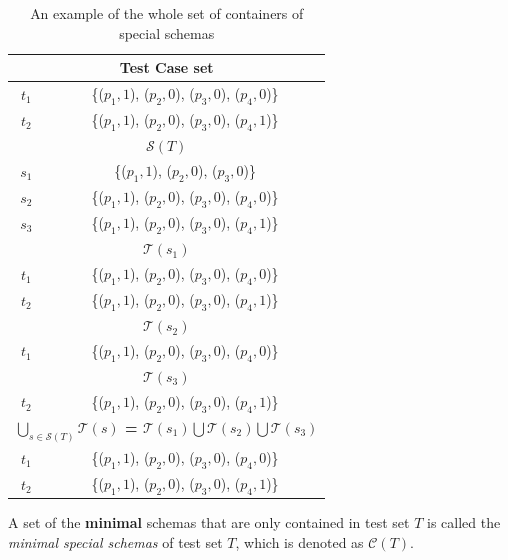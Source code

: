 \begin{table}[htbp]
  \centering
  \caption{An example of the whole set of containers of special schemas}
      \label{ex:prospecialschemasoftestset}
    \begin{tabular}{|c|c|} \hline
  \multicolumn{2}{|c|}{\textbf{Test Case set}} \\ \hline
  $t_{1}$ & \{($p_{1}, 1$), ($p_{2}, 0$), ($p_{3}, 0$), ($p_{4}, 0$)\}\\
  $t_{2}$ & \{($p_{1}, 1$), ($p_{2}, 0$), ($p_{3}, 0$), ($p_{4}, 1$)\}\\ \hline
  \multicolumn{2}{|c|}{\textbf{ $\mathcal{S}(T)$ }}  \\ \hline
  $s_{1}$ & \{($p_{1}, 1$), ($p_{2}, 0$), ($p_{3}, 0$)\}  \\
  $s_{2}$ & \{($p_{1}, 1$), ($p_{2}, 0$), ($p_{3}, 0$), ($p_{4}, 0$)\} \\
  $s_{3}$ & \{($p_{1}, 1$), ($p_{2}, 0$), ($p_{3}, 0$), ($p_{4}, 1$)\} \\ \hline
   \multicolumn{2}{|c|}{\textbf{ $\mathcal{T}(s_{1})$}}  \\ \hline
  $t_{1}$ & \{($p_{1}, 1$), ($p_{2}, 0$), ($p_{3}, 0$), ($p_{4}, 0$)\} \\
  $t_{2}$ & \{($p_{1}, 1$), ($p_{2}, 0$), ($p_{3}, 0$), ($p_{4}, 1$)\} \\ \hline
      \multicolumn{2}{|c|}{\textbf{ $\mathcal{T}(s_{2})$}}  \\ \hline
  $t_{1}$ & \{($p_{1}, 1$), ($p_{2}, 0$), ($p_{3}, 0$), ($p_{4}, 0$)\} \\ \hline
      \multicolumn{2}{|c|}{\textbf{ $\mathcal{T}(s_{3})$}}  \\ \hline
  $t_{2}$ & \{($p_{1}, 1$), ($p_{2}, 0$), ($p_{3}, 0$), ($p_{4}, 1$)\} \\ \hline
    \multicolumn{2}{|c|}{\textbf{  $\bigcup_{s \in \mathcal{S}(T)}\mathcal{T}(s)$ = $\mathcal{T}(s_{1}) \bigcup \mathcal{T}(s_{2}) \bigcup\mathcal{T}(s_{3})$ }}  \\ \hline
  $t_{1}$ & \{($p_{1}, 1$), ($p_{2}, 0$), ($p_{3}, 0$), ($p_{4}, 0$)\} \\
  $t_{2}$ & \{($p_{1}, 1$), ($p_{2}, 0$), ($p_{3}, 0$), ($p_{4}, 1$)\} \\ \hline
    \end{tabular}%
\end{table}%


\begin{definition} \label{de:minimalschema}
 A set of the \textbf{minimal} schemas that are only contained in test set $T$ is called the \emph{minimal special schemas} of test set $T$, which is denoted as $\mathcal{C}(T)$.
\end{definition}

